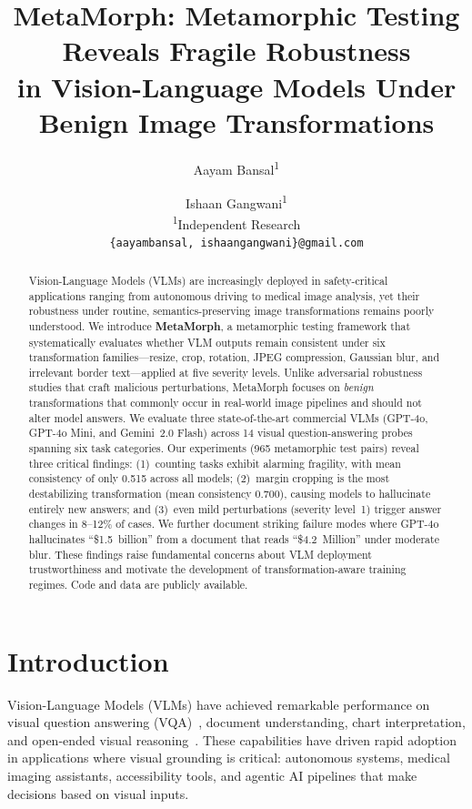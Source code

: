 \documentclass[10pt,twocolumn,letterpaper]{article}
\title{MetaMorph: Metamorphic Testing Reveals Fragile Robustness\\in Vision-Language Models Under Benign Image Transformations}
\author{Aayam Bansal\textsuperscript{1} \and Ishaan Gangwani\textsuperscript{1}\\
\textsuperscript{1}Independent Research\\
{\tt\small \{aayambansal, ishaangangwani\}@gmail.com}}
\begin{document}
\maketitle

\begin{abstract}
Vision-Language Models (VLMs) are increasingly deployed in safety-critical applications ranging from autonomous driving to medical image analysis, yet their robustness under routine, semantics-preserving image transformations remains poorly understood. We introduce \textbf{MetaMorph}, a metamorphic testing framework that systematically evaluates whether VLM outputs remain consistent under six transformation families---resize, crop, rotation, JPEG compression, Gaussian blur, and irrelevant border text---applied at five severity levels. Unlike adversarial robustness studies that craft malicious perturbations, MetaMorph focuses on \emph{benign} transformations that commonly occur in real-world image pipelines and should not alter model answers. We evaluate three state-of-the-art commercial VLMs (GPT-4o, GPT-4o Mini, and Gemini~2.0 Flash) across 14 visual question-answering probes spanning six task categories. Our experiments (965 metamorphic test pairs) reveal three critical findings: (1)~counting tasks exhibit alarming fragility, with mean consistency of only 0.515 across all models; (2)~margin cropping is the most destabilizing transformation (mean consistency 0.700), causing models to hallucinate entirely new answers; and (3)~even mild perturbations (severity level~1) trigger answer changes in 8--12\% of cases. We further document striking failure modes where GPT-4o hallucinates ``\$1.5~billion'' from a document that reads ``\$4.2~Million'' under moderate blur. These findings raise fundamental concerns about VLM deployment trustworthiness and motivate the development of transformation-aware training regimes. Code and data are publicly available.
\end{abstract}

\section{Introduction}
\label{sec:intro}

Vision-Language Models (VLMs) have achieved remarkable performance on visual question answering (VQA)~\cite{goyal2017vqav2}, document understanding, chart interpretation, and open-ended visual reasoning~\cite{liu2024visual,li2023blip2,openai2024gpt4o,team2024gemini}. These capabilities have driven rapid adoption in applications where visual grounding is critical: autonomous systems, medical imaging assistants, accessibility tools, and agentic AI pipelines that make decisions based on visual inputs.
\end{document}

